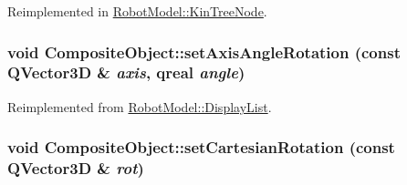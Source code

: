 Reimplemented in \hyperlink{class_robot_model_1_1_kin_tree_node_a85f4364980f9144471b9d92e175c539e}{RobotModel::KinTreeNode}.\hypertarget{class_robot_model_1_1_composite_object_a43f99ed52def7114d310e29fc6db83f3}{
\subsubsection[{setAxisAngleRotation}]{\setlength{\rightskip}{0pt plus 5cm}void CompositeObject::setAxisAngleRotation (const QVector3D \& {\em axis}, \/  qreal {\em angle})}}
\label{class_robot_model_1_1_composite_object_a43f99ed52def7114d310e29fc6db83f3}


Reimplemented from \hyperlink{class_robot_model_1_1_display_list_a56a652740c494995c0ff55d1a5fd896d}{RobotModel::DisplayList}.\hypertarget{class_robot_model_1_1_composite_object_a12e8961ebc63d8a253d915b29b356162}{
\subsubsection[{setCartesianRotation}]{\setlength{\rightskip}{0pt plus 5cm}void CompositeObject::setCartesianRotation (const QVector3D \& {\em rot})}}
\label{class_robot_model_1_1_composite_object_a12e8961ebc63d8a253d915b29b356162}


